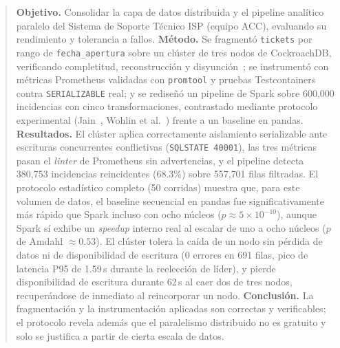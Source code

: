 \begin{abstract}
\noindent
\textbf{Objetivo.} Consolidar la capa de datos distribuida y el pipeline analítico paralelo del
Sistema de Soporte Técnico ISP (equipo ACC), evaluando su rendimiento y tolerancia a fallos. \textbf{Método.} Se fragmentó \texttt{tickets} por rango de \texttt{fecha\_apertura} sobre un
clúster de tres nodos de CockroachDB, verificando completitud, reconstrucción y
disyunción~\cite{ozsu2011principles}; se instrumentó con métricas Prometheus validadas con
\texttt{promtool} y pruebas Testcontainers contra \texttt{SERIALIZABLE} real; y se rediseñó un
pipeline de Spark sobre 600{,}000 incidencias con cinco transformaciones, contrastado mediante
protocolo experimental (Jain~\cite{jain1991art}, Wohlin et al.~\cite{wohlin2012experimentation})
frente a un baseline en pandas.
\textbf{Resultados.} El clúster aplica correctamente aislamiento serializable ante escrituras
concurrentes conflictivas (\texttt{SQLSTATE 40001}), las tres métricas pasan el \emph{linter} de
Prometheus sin advertencias, y el pipeline detecta 380{,}753 incidencias reincidentes (68.3\%)
sobre 557{,}701 filas filtradas. El protocolo estadístico completo (50 corridas) muestra que,
para este volumen de datos, el baseline secuencial en pandas fue significativamente más rápido que
Spark incluso con ocho núcleos ($p \approx 5\times10^{-10}$), aunque Spark sí exhibe un
\emph{speedup} interno real al escalar de uno a ocho núcleos ($p$ de Amdahl $\approx 0.53$). El
clúster tolera la caída de un nodo sin pérdida de datos ni de disponibilidad de escritura (0
errores en 691 filas, pico de latencia P95 de 1.59\,s durante la reelección de líder), y pierde
disponibilidad de escritura durante 62\,s al caer dos de tres nodos, recuperándose de inmediato al
reincorporar un nodo. \textbf{Conclusión.} La fragmentación y la
instrumentación aplicadas son correctas y verificables; el protocolo revela además que el
paralelismo distribuido no es gratuito y solo se justifica a partir de cierta escala de datos.
\end{abstract}


